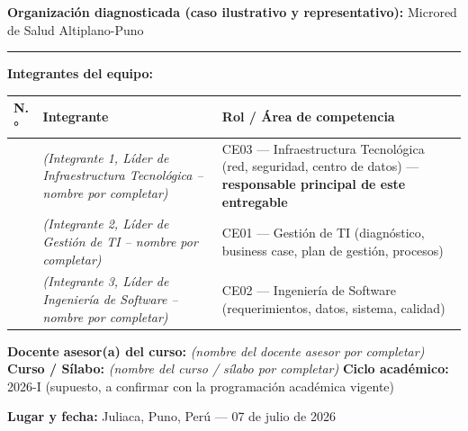 \documentclass[11pt,a4paper]{article}
\begin{document}
\textbf{Organización diagnosticada (caso ilustrativo y representativo):} Microred de Salud Altiplano-Puno

\begin{center}\rule{0.5\linewidth}{0.5pt}\end{center}

\textbf{Integrantes del equipo:}

{\small
\begin{longtable}[]{@{}
  >{\raggedright\arraybackslash}p{}
  >{\raggedright\arraybackslash}p{}
  >{\raggedright\arraybackslash}p{}@{}}
\toprule\noalign{}
\begin{minipage}[b]{\linewidth}\raggedright
N.°
\end{minipage} & \begin{minipage}[b]{\linewidth}\raggedright
Integrante
\end{minipage} & \begin{minipage}[b]{\linewidth}\raggedright
Rol / Área de competencia
\end{minipage} \\
\midrule\noalign{}
\endhead
\bottomrule\noalign{}
\endlastfoot
1 & \textit{(Integrante 1, Líder de Infraestructura Tecnológica -- nombre por completar)} & CE03 --- Infraestructura Tecnológica (red, seguridad, centro de datos) --- \textbf{responsable principal de este entregable} \\
2 & \textit{(Integrante 2, Líder de Gestión de TI -- nombre por completar)} & CE01 --- Gestión de TI (diagnóstico, business case, plan de gestión, procesos) \\
3 & \textit{(Integrante 3, Líder de Ingeniería de Software -- nombre por completar)} & CE02 --- Ingeniería de Software (requerimientos, datos, sistema, calidad) \\
\end{longtable}
}

\textbf{Docente asesor(a) del curso:} \textit{(nombre del docente asesor por completar)}
\textbf{Curso / Sílabo:} \textit{(nombre del curso / s\'ilabo por completar)}
\textbf{Ciclo académico:} 2026-I (supuesto, a confirmar con la programación académica vigente)

\textbf{Lugar y fecha:} Juliaca, Puno, Perú --- 07 de julio de 2026
\end{document}
